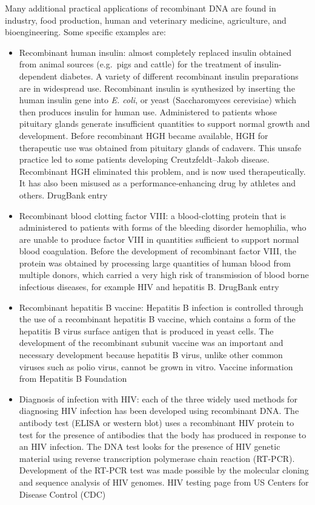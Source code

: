 Many additional practical applications of recombinant DNA are found in industry, food production, human and veterinary medicine, agriculture, and bioengineering. Some specific examples are:

\begin{itemize}
\tightlist
\item
  Recombinant human insulin: almost completely replaced insulin obtained from animal sources (e.g.~pigs and cattle) for the treatment of insulin-dependent diabetes. A variety of different recombinant insulin preparations are in widespread use. Recombinant insulin is synthesized by inserting the human insulin gene into \emph{E. coli}, or yeast (Saccharomyces cerevisiae) which then produces insulin for human use. Administered to patients whose pituitary glands generate insufficient quantities to support normal growth and development. Before recombinant HGH became available, HGH for therapeutic use was obtained from pituitary glands of cadavers. This unsafe practice led to some patients developing Creutzfeldt--Jakob disease. Recombinant HGH eliminated this problem, and is now used therapeutically. It has also been misused as a performance-enhancing drug by athletes and others. DrugBank entry
\item
  Recombinant blood clotting factor VIII: a blood-clotting protein that is administered to patients with forms of the bleeding disorder hemophilia, who are unable to produce factor VIII in quantities sufficient to support normal blood coagulation. Before the development of recombinant factor VIII, the protein was obtained by processing large quantities of human blood from multiple donors, which carried a very high risk of transmission of blood borne infectious diseases, for example HIV and hepatitis B. DrugBank entry
\item
  Recombinant hepatitis B vaccine: Hepatitis B infection is controlled through the use of a recombinant hepatitis B vaccine, which contains a form of the hepatitis B virus surface antigen that is produced in yeast cells. The development of the recombinant subunit vaccine was an important and necessary development because hepatitis B virus, unlike other common viruses such as polio virus, cannot be grown in vitro. Vaccine information from Hepatitis B Foundation
\item
  Diagnosis of infection with HIV: each of the three widely used methods for diagnosing HIV infection has been developed using recombinant DNA. The antibody test (ELISA or western blot) uses a recombinant HIV protein to test for the presence of antibodies that the body has produced in response to an HIV infection. The DNA test looks for the presence of HIV genetic material using reverse transcription polymerase chain reaction (RT-PCR). Development of the RT-PCR test was made possible by the molecular cloning and sequence analysis of HIV genomes. HIV testing page from US Centers for Disease Control (CDC)

\end{itemize}
